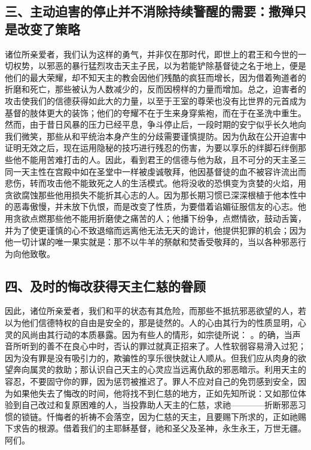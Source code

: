 
\subsection{三、主动迫害的停止并不消除持续警醒的需要：撒殚只是改变了策略}

诸位所亲爱者，我们认为这样的勇气，并非仅在那时代，即世上的君王和今世的一切权势，以邪恶的暴行猛烈攻击天主子民，以为若能铲除基督徒之名于地上，便是他们的最大荣耀，却不知天主的教会因他们残酷的疯狂而增长，因为借着殉道者的折磨和死亡，那些被认为人数减少的，反而因榜样的力量而增加。总之，迫害者的攻击使我们的信德获得如此大的力量，以至于王室的尊荣也没有比世界的元首成为基督的肢体更大的装饰；他们的夸耀不在于生来身穿紫袍，而在于在圣洗中重生。然而，由于昔日风暴的压力已经平息，争斗停止后，一段时期的安宁似乎长久地向我们微笑，那些从和平统治本身产生的分歧需要谨慎提防。因为仇敌在公开迫害中证明无效之后，现在运用隐秘的技巧进行残忍的伤害，为要以享乐的绊脚石绊倒那些他不能用苦难打击的人。因此，看到君王的信德与他为敌，且不可分的天主圣三同一天主性在宫殿中如在圣堂中一样被虔诚敬拜，他因基督徒的血不被容许流出而悲伤，转而攻击他不能致死之人的生活模式。他将没收的恐惧变为贪婪的火焰，用贪欲腐蚀那些他用损失不能折其心志的人。因为那长期习惯已深深根植于他本性中的恶毒傲慢，并未放下仇恨，而是改变了性质，为要借着谄媚征服信友的心志。他用贪欲点燃那些他不能用折磨使之痛苦的人；他播下纷争，点燃情欲，鼓动舌簧，并为了使更谨慎的心不致退缩而远离他无法无天的诡计，他提供犯罪的机会；因为他一切计谋的唯一果实就是：那不以牛羊的祭献和焚香受敬拜的，当以各种邪恶行为向他致敬。\par


\subsection{四、及时的悔改获得天主仁慈的眷顾}

因此，诸位所亲爱者，我们和平的状态有其危险，而那些不抵抗邪恶欲望的人，若以为他们信德特权的自由是安全的，那是徒然的。人的心由其行为的性质显明，心灵的风尚由其行动的本质暴露。因为有些人的情形，如宗徒所说： 。的确，当声音所听到的善不在良心中时，否认的罪过就真正招来了。人性软弱容易滑入过犯；因为没有罪是没有吸引力的，欺骗性的享乐很快就让人顺从。但我们应从肉身的欲望奔向属灵的救助；那认识自己天主的心灵应当远离仇敌的邪恶暗示。利用天主的容忍，不要固守你的罪，因为惩罚被推迟了。罪人不应对自己的免罚感到安全，因为如果他失去了悔改的时间，他将找不到仁慈的地方，正如先知所说：又如那位体验到自己改过和复原困难的人，当投靠助人天主的仁慈，求祂————折断邪恶习惯的锁链。忏悔者的祈祷不会落空，因为仁慈的天主，且要赐下所求的，正如祂赐下求告的根源。借着我们的主耶稣基督，祂和圣父及圣神，永生永王，万世无疆。阿们。\par

